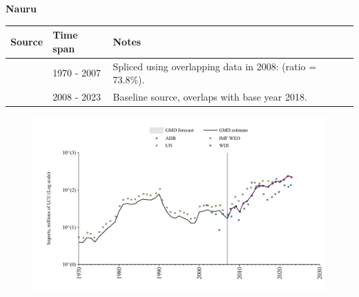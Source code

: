 \documentclass[12pt,a4paper,landscape]{article}
\begin{document}
\begin{adjustbox}{max totalsize={\paperwidth}{\paperheight},center}
\begin{minipage}[t][\textheight][t]{\textwidth}
\vspace*{0.5cm}
{}
\begin{center}
{\Large\bfseries Nauru}
\end{center}
\vspace{0.5cm}
\begin{table}[H]
\centering
\small
\begin{tabular}{|l|l|l|}
\hline
\textbf{Source} & \textbf{Time span} & \textbf{Notes} \\
\hline
\rowcolor{white}\cite{UN}& 1970 - 2007 &Spliced using overlapping data in 2008: (ratio = 73.8\%).\\
\rowcolor{lightgray}\cite{WDI}& 2008 - 2023 &Baseline source, overlaps with base year 2018.\\
\hline
\end{tabular}
\end{table}
\begin{figure}[H]
\centering
\includegraphics[width=\textwidth,height=0.6\textheight,keepaspectratio]{graphs/NRU_imports.pdf}
\end{figure}
\end{minipage}
\end{adjustbox}
\end{document}
